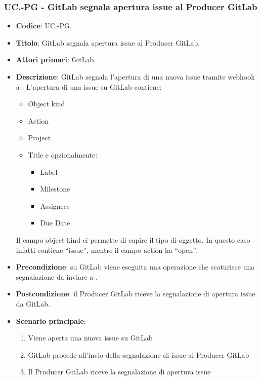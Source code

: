 \subsubsection{UC\theuccount.\thesubuccount-PG - GitLab segnala apertura issue al Producer GitLab}
\begin{itemize}
    \item \textbf{Codice}: UC\theuccount.\thesubuccount-PG.
    \item \textbf{Titolo}: GitLab segnala apertura issue al Producer GitLab.
    \item \textbf{Attori primari}: GitLab.
    \item \textbf{Descrizione}: GitLab segnala l'apertura di una nuova issue tramite webhook a \progetto.
    L'apertura di una issue su GitLab contiene:
    \begin{itemize}
        \item Object kind
        \item Action
        \item Project
        \item Title e opzionalmente:
        \begin{itemize}
            \item Label
            \item Milestone
            \item Assignees
            \item Due Date
        \end{itemize}
    \end{itemize}
    Il campo object kind ci permette di capire il tipo di oggetto. In questo caso infatti contiene ``issue'', mentre il campo action ha ``open''.
    \item \textbf{Precondizione}: su GitLab viene eseguita una operazione che scaturisce una
    segnalazione da inviare a \progetto.
    \item \textbf{Postcondizione}: il Producer GitLab riceve la segnalazione di apertura issue da GitLab.
    \item \textbf{Scenario principale}:
    \begin{enumerate}
        \item Viene aperta una nuova issue su GitLab
        \item GitLab procede all'invio della segnalazione di issue al Producer GitLab
        \item Il Producer GitLab riceve la segnalazione di apertura issue
    \end{enumerate}

\end{itemize}

